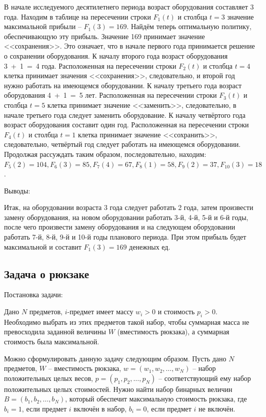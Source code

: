 В начале исследуемого десятилетнего периода возраст оборудования составляет 3 года. Находим в таблице на пересечении строки $F_1(t)$ и столбца $t=3$ значение максимальной прибыли -- $F_1(3)=169$. Найдём теперь оптимальную политику, обеспечивающую эту прибыль. Значение 169 принимает значение <<сохранения>>.  Это означает, что в начале первого года принимается решение о сохранении оборудования. К началу второго года возраст оборудования \mbox{3 + 1 = 4} года. Расположенная на пересечении строки $F_2(t)$ и столбца $t=4$ клетка принимает значения <<сохранения>>, следовательно, и второй год нужно работать на имеющемся оборудовании. К началу третьего года возраст оборудования \mbox{4 + 1 = 5} лет. Расположенная на пересечении строки $F_3(t)$ и столбца $t=5$ клетка принимает значение <<заменить>>, следовательно, в начале третьего года следует заменить оборудование. К началу четвёртого года возраст оборудования составит один год. Расположенная на пересечении строки $F_4(t)$ и столбца $t=1$ клетка принимает значение <<сохранить>>, следовательно, четвёртый год следует работать на имеющемся оборудовании. Продолжая рассуждать таким образом, последовательно, находим: $F_5(2) = 104, F_6(3) = 85, F_7(4) = 67, F_8(1) = 58, F_9(2) = 37, F_{10}(3) = 18$.

Выводы:

Итак, на оборудовании возраста 3 года следует работать 2 года, затем произвести замену оборудования, на новом оборудовании работать 3-й, 4-й, 5-й и 6-й годы, после чего произвести замену оборудования и на следующем оборудовании работать 7-й, 8-й, 9-й и 10-й годы планового периода. При этом прибыль будет максимальной и составит $F_1(3)=169$ денежных ед.



\subsection{Задача о рюкзаке}

\indent Постановка задачи: 

Дано $N$ предметов, $i$-предмет имеет массу $w_i > 0$ и стоимость $p_i > 0$. Необходимо выбрать из этих предметов такой набор, чтобы суммарная масса не превосходила заданной величины $W$ (вместимость рюкзака), а суммарная стоимость была максимальной.

Можно сформулировать данную задачу следующим образом. Пусть дано $N$ предметов, $W$ -- вместимость рюкзака, $w=(w_1,w_2, \hdots, w_N)$ -- набор положительных целых весов, $p=(p_1,p_2, \hdots, p_N)$ -- соответствующий ему набор положительных целых стоимостей. Нужно найти набор бинарных величин $B=(b_1,b_2,\hdots, b_N)$, который обеспечит максимальную стоимость рюкзака, где $b_i=1$, если предмет $i$ включён в набор, $b_i=0$, если предмет $i$ не включён.

